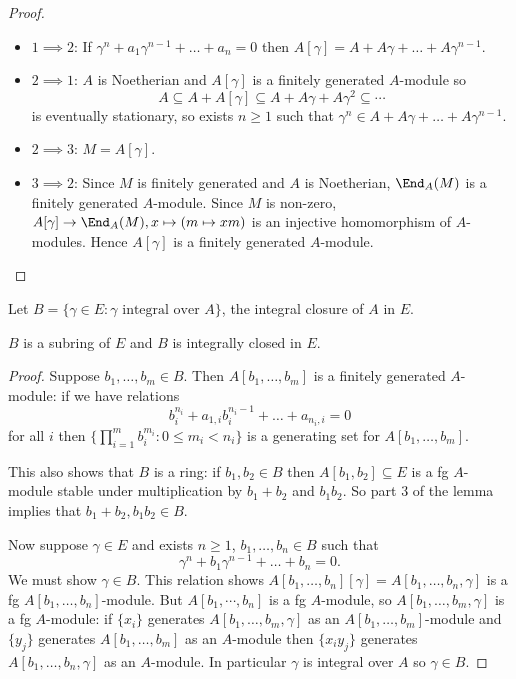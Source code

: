 \documentclass[a4paper]{article}
\begin{document}
\begin{proof}\leavevmode
  \begin{itemize}
  \item \(1 \implies 2\): If \(\gamma^n + a_1 \gamma^{n - 1} + \dots + a_n = 0\) then \(A[\gamma] = A + A \gamma + \dots + A\gamma^{n - 1}\).
  \item \(2 \implies 1\): \(A\) is Noetherian and \(A[\gamma]\) is a finitely generated \(A\)-module so
    \[
      A \subseteq A + A[\gamma] \subseteq A + A\gamma +A\gamma^2 \subseteq \cdots
    \]
    is eventually stationary, so exists \(n \geq 1\) such that \(\gamma^n \in A + A\gamma + \dots + A\gamma^{n - 1}\).
  \item \(2 \implies 3\): \(M = A[\gamma]\).
  \item \(3 \implies 2\): Since \(M\) is finitely generated and \(A\) is Noetherian, \(\End_A(M)\) is a finitely generated \(A\)-module. Since \(M\) is non-zero, \(A[\gamma] \to \End_A(M), x \mapsto (m \mapsto xm)\) is an injective homomorphism of \(A\)-modules. Hence \(A[\gamma]\) is a finitely generated \(A\)-module.
  \end{itemize}
\end{proof}

Let \(B = \{\gamma \in E: \gamma \text{ integral over } A\}\), the integral closure of \(A\) in \(E\).

\begin{lemma}
  \(B\) is a subring of \(E\) and \(B\) is integrally closed in \(E\).
\end{lemma}

\begin{proof}
  Suppose \(b_1, \dots, b_m \in B\). Then \(A[b_1, \dots, b_m]\) is a finitely generated \(A\)-module: if we have relations
  \[
    b_i^{n_i} + a_{1, i} b_i^{n_i - 1} + \dots + a_{n_i, i} = 0
  \]
  for all \(i\) then \(\{\prod_{i = 1}^m b_i^{m_i}: 0 \leq m_i < n_i\}\) is a generating set for \(A[b_1, \dots, b_m]\).

  This also shows that \(B\) is a ring: if \(b_1, b_2 \in B\) then \(A[b_1, b_2] \subseteq E\) is a fg \(A\)-module stable under multiplication by \(b_1 + b_2\) and \(b_1b_2\). So part 3 of the lemma implies that \(b_1 + b_2, b_1b_2 \in B\).

  Now suppose \(\gamma \in E\) and exists \(n \geq 1\), \(b_1, \dots, b_n \in B\) such that
  \[
    \gamma^n + b_1 \gamma^{n - 1} + \dots + b_n = 0.
  \]
  We must show \(\gamma \in B\). This relation shows \(A[b_1, \dots, b_n][\gamma] = A[b_1, \dots, b_n, \gamma]\) is a fg \(A[b_1, \dots, b_n]\)-module. But \(A[b_1, \cdots, b_n]\) is a fg \(A\)-module, so \(A[b_1, \dots, b_m, \gamma]\) is a fg \(A\)-module: if \(\{x_i\}\) generates \(A[b_1, \dots, b_m, \gamma]\) as an \(A[b_1, \dots, b_m]\)-module and \(\{y_j\}\) generates \(A[b_1, \dots, b_m]\) as an \(A\)-module then \(\{x_i y_j\}\) generates \(A[b_1, \dots, b_n, \gamma]\) as an \(A\)-module. In particular \(\gamma\) is integral over \(A\) so \(\gamma \in B\).
\end{proof}
\end{document}
